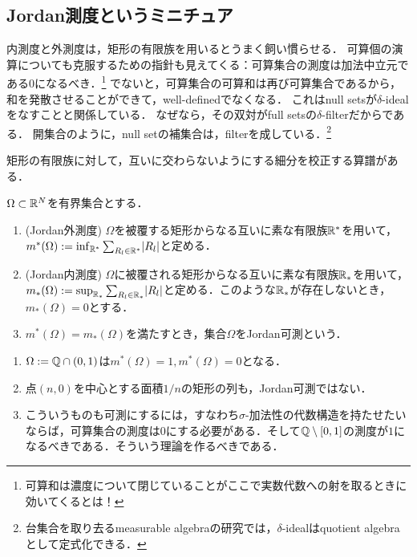 \documentclass[uplatex, dvipdfmx]{jsreport}
\begin{document}
\subsection{Jordan測度というミニチュア}

\begin{tcolorbox}[colframe=ForestGreen, colback=ForestGreen!10!white,breakable,colbacktitle=ForestGreen!40!white,coltitle=black,fonttitle=\bfseries\sffamily,
title=有限加法族上の有限加法的測度]
    内測度と外測度は，矩形の有限族を用いるとうまく飼い慣らせる．
    可算個の演算についても克服するための指針も見えてくる：可算集合の測度は加法中立元である$0$になるべき．\footnote{可算和は濃度について閉じていることがここで実数代数への射を取るときに効いてくるとは！}
    でないと，可算集合の可算和は再び可算集合であるから，和を発散させることができて，well-definedでなくなる．
    これはnull setsが$\delta$-idealをなすことと関係している．
    なぜなら，その双対がfull setsの$\delta$-filterだからである．
    開集合のように，null setの補集合は，filterを成している．\footnote{台集合を取り去るmeasurable algebraの研究では，$\delta$-idealはquotient algebraとして定式化できる．}
\end{tcolorbox}

\begin{lemma}
    矩形の有限族に対して，互いに交わらないようにする細分を校正する算譜がある．
\end{lemma}

\begin{definition}
    $\Omega\subset\mathbb{R}^N$を有界集合とする．
    \begin{enumerate}
        \item (Jordan外測度) $\Omega$を被覆する矩形からなる互いに素な有限族$\mathbb{R}^*$を用いて，$m^*(\Omega):=\inf_{\mathbb{R}^*}\sum_{R_l\in\mathbb{R}^*}\lvert R_l\rvert$と定める．
        \item (Jordan内測度) $\Omega$に被覆される矩形からなる互いに素な有限族$\mathbb{R}_*$を用いて，$m_*(\Omega):=\sup_{\mathbb{R}_*}\sum_{R_l\in\mathbb{R}_*}\lvert R_l\rvert$と定める．このような$\mathbb{R}_*$が存在しないとき，$m_*(\Omega)=0$とする．
        \item $m^*(\Omega)=m_*(\Omega)$を満たすとき，集合$\Omega$をJordan可測という．
    \end{enumerate}
\end{definition}

\begin{example}\mbox{}
    \begin{enumerate}
        \item $\Omega:=\mathbb{Q}\cap(0,1)$は$m^*(\Omega)=1,m^*(\Omega)=0$となる．
        \item 点$(n,0)$を中心とする面積$1/n$の矩形の列も，Jordan可測ではない．
        \item こういうものも可測にするには，すなわち$\sigma$-加法性の代数構造を持たせたいならば，可算集合の測度は$0$にする必要がある．そして$\mathbb{Q}\setminus[0,1]$の測度が$1$になるべきである．そういう理論を作るべきである．
    \end{enumerate}
\end{example}
\end{document}
